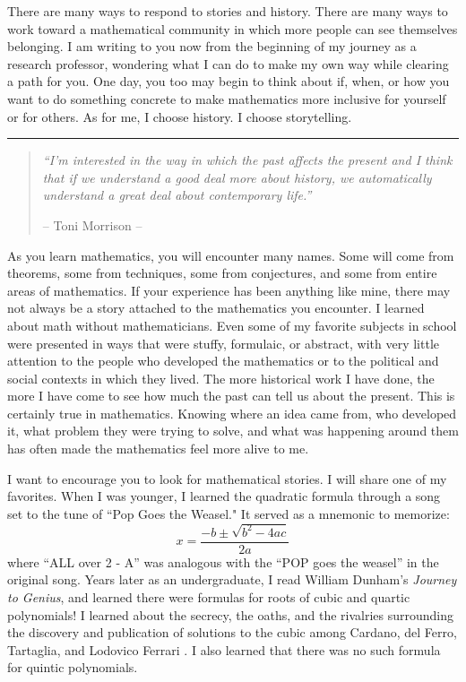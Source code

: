 \documentclass[pdflatex,sn-mathphys-num]{sn-jnl}%
\newcommand{\letterbreak}{%
    \par\bigskip
    \noindent\rule{\textwidth}{0.4pt}
    \bigskip
}
\begin{document}
There are many ways to respond to stories and history. There are many ways to work toward a mathematical community in which more people can see themselves belonging. I am writing to you now from the beginning of my journey as a research professor, wondering what I can do to make my own way while clearing a path for you. One day, you too may begin to think about if, when, or how you want to do something concrete to make mathematics more inclusive for yourself or for others. As for me, I choose history. I choose storytelling.\\



\letterbreak


\begin{quote}
\emph{``I'm interested in the way in which the past affects the present and I think that if we understand a good deal more about history, we automatically understand a great deal about contemporary life.''}

\hfill -- Toni Morrison \cite{morrison2008what} --
\end{quote}


As you learn mathematics, you will encounter many names. Some will come from theorems, some from techniques, some from conjectures, and some from entire areas of mathematics. If your experience has been anything like mine, there may not always be a story attached to the mathematics you encounter. I learned about math without mathematicians. Even some of my favorite subjects in school were presented in ways that were stuffy, formulaic, or abstract, with very little attention to the people who developed the mathematics or to the political and social contexts in which they lived. The more historical work I have done, the more I have come to see how much the past can tell us about the present. This is certainly true in mathematics. Knowing where an idea came from, who developed it, what problem they were trying to solve, and what was happening around them has often made the mathematics feel more alive to me. 

I want to encourage you to look for mathematical stories. I will share one of my favorites. When I was younger, I learned the quadratic formula through a song set to the tune of ``Pop Goes the Weasel." It served as a mnemonic to memorize: 
$$\displaystyle x = \dfrac{-b \pm \sqrt{b^2-4ac}}{2a} $$
\noindent where ``ALL over 2 - A'' was analogous with the ``POP goes the weasel'' in the original song. Years later as an undergraduate, I read William Dunham's \emph{Journey to Genius}, and learned there were formulas for roots of cubic and quartic polynomials! I learned about the secrecy, the oaths, and the rivalries surrounding the discovery and publication of solutions to the cubic among Cardano, del Ferro, Tartaglia, and Lodovico Ferrari \cite{dunham1990journey}. I also learned that there was no such formula for quintic polynomials.  
\end{document}
